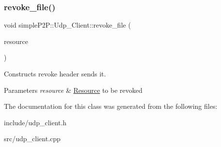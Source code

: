 \subsubsection{\texorpdfstring{revoke\+\_\+file()}{revoke\_file()}}
{\footnotesize\ttfamily void simple\+P2\+P\+::\+Udp\+\_\+\+Client\+::revoke\+\_\+file (\begin{DoxyParamCaption}\item[{\hyperlink{classsimpleP2P_1_1Resource}{simple\+P2\+P\+::\+Resource}}]{resource }\end{DoxyParamCaption})}



Constructs revoke header sends it. 


\begin{DoxyParams}{Parameters}
{\em resource} & \hyperlink{classsimpleP2P_1_1Resource}{Resource} to be revoked \\
\hline
\end{DoxyParams}


The documentation for this class was generated from the following files\+:\begin{DoxyCompactItemize}
\item 
include/udp\+\_\+client.\+h\item 
src/udp\+\_\+client.\+cpp\end{DoxyCompactItemize}
